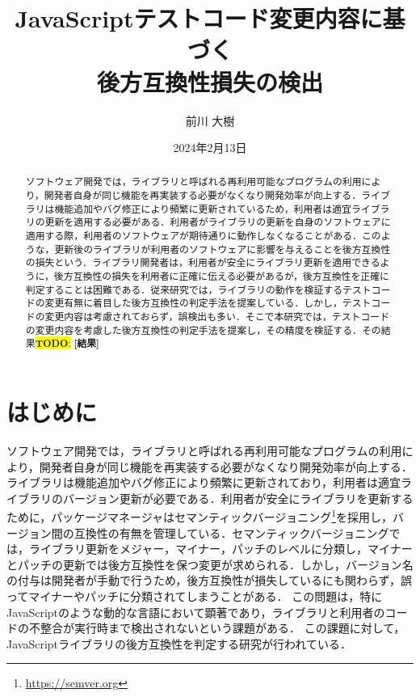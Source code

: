 \documentclass[11pt,dvipdfmx]{jreport}
\title{JavaScriptテストコード変更内容に基づく\\後方互換性損失の検出}
\author{前川 大樹}
\date{2024年2月13日}	%
\newcommand{\todo}[1]{\colorbox{yellow}{{\bf TODO}:}{\color{red} {\textbf{[#1]}}}}
\begin{document}
\maketitle

\begin{abstract}
  ソフトウェア開発では，ライブラリと呼ばれる再利用可能なプログラムの利用により，開発者自身が同じ機能を再実装する必要がなくなり開発効率が向上する．ライブラリは機能追加やバグ修正により頻繁に更新されているため，利用者は適宜ライブラリの更新を適用する必要がある．利用者がライブラリの更新を自身のソフトウェアに適用する際，利用者のソフトウェアが期待通りに動作しなくなることがある．このような，更新後のライブラリが利用者のソフトウェアに影響を与えることを後方互換性の損失という．ライブラリ開発者は，利用者が安全にライブラリ更新を適用できるように，後方互換性の損失を利用者に正確に伝える必要があるが，後方互換性を正確に判定することは困難である．従来研究では，ライブラリの動作を検証するテストコードの変更有無に着目した後方互換性の判定手法を提案している．しかし，テストコードの変更内容は考慮されておらず，誤検出も多い．そこで本研究では，テストコードの変更内容を考慮した後方互換性の判定手法を提案し，その精度を検証する．その結果\todo{結果}

\end{abstract}

\tableofcontents



\newpage
{}	%



\chapter{はじめに}
ソフトウェア開発では，ライブラリと呼ばれる再利用可能なプログラムの利用により，開発者自身が同じ機能を再実装する必要がなくなり開発効率が向上する．ライブラリは機能追加やバグ修正により頻繁に更新されており，利用者は適宜ライブラリのバージョン更新が必要である．利用者が安全にライブラリを更新するために，パッケージマネージャはセマンティックバージョニング\footnote{\url{https://semver.org}}を採用し，バージョン間の互換性の有無を管理している．セマンティックバージョニングでは，ライブラリ更新をメジャー，マイナー，パッチのレベルに分類し，マイナーとパッチの更新では後方互換性を保つ変更が求められる．しかし，バージョン名の付与は開発者が手動で行うため，後方互換性が損失しているにも関わらず，誤ってマイナーやパッチに分類されてしまうことがある．
この問題は，特にJavaScriptのような動的な言語において顕著であり，ライブラリと利用者のコードの不整合が実行時まで検出されないという課題がある．
この課題に対して，JavaScriptライブラリの後方互換性を判定する研究が行われている．
\end{document}
